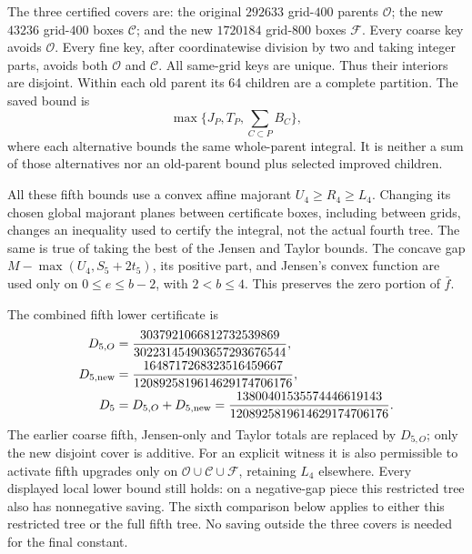 The three certified covers are: the original $292633$ grid-$400$
parents $\mathcal O$; the new $43236$ grid-$400$ boxes $\mathcal C$;
and the new $1720184$ grid-$800$ boxes $\mathcal F$.
Every coarse key avoids $\mathcal O$. Every fine key, after
coordinatewise division by two and taking integer parts, avoids
both $\mathcal O$ and $\mathcal C$. All same-grid keys are unique.
Thus their interiors are disjoint. Within each old parent its
64 children are a complete partition. The saved bound is
\[
 \max\{J_P,T_P,\sum_{C\subset P}B_C\},
\]
where each alternative bounds the same whole-parent integral.
It is neither a sum of those alternatives nor an old-parent bound
plus selected improved children.

All these fifth bounds use a convex affine majorant
$U_4\ge R_4\ge L_4$. Changing its chosen global majorant planes
between certificate boxes, including between grids, changes an
inequality used to certify the integral, not the actual fourth tree.
The same is true of taking the best of the Jensen and Taylor bounds.
The concave gap $M-\max(U_4,S_5+2t_5)$, its positive part, and
Jensen's convex function are used only on $0\le e\le b-2$, with
$2<b\le4$. This preserves the zero portion of $\bar f$.

The combined fifth lower certificate is
\[
 \begin{split}
 D_{5,O}&=\frac{3037921066812732539869}
                    {302231454903657293676544},\\
 D_{5,\rm new}&=\frac{1648717268323516459667}
                    {1208925819614629174706176},\\
 D_5&=D_{5,O}+D_{5,\rm new}
     =\frac{13800401535574446619143}
                    {1208925819614629174706176}.
 \end{split}
\]
The earlier coarse fifth, Jensen-only and Taylor totals are
replaced by $D_{5,O}$; only the new disjoint cover is additive.
For an explicit witness it is also permissible to activate fifth
upgrades only on $\mathcal O\cup\mathcal C\cup\mathcal F$, retaining
$L_4$ elsewhere. Every displayed local lower bound still holds:
on a negative-gap piece this restricted tree also has nonnegative
saving. The sixth comparison below applies to either this restricted
tree or the full fifth tree. No saving outside the three covers is
needed for the final constant.

